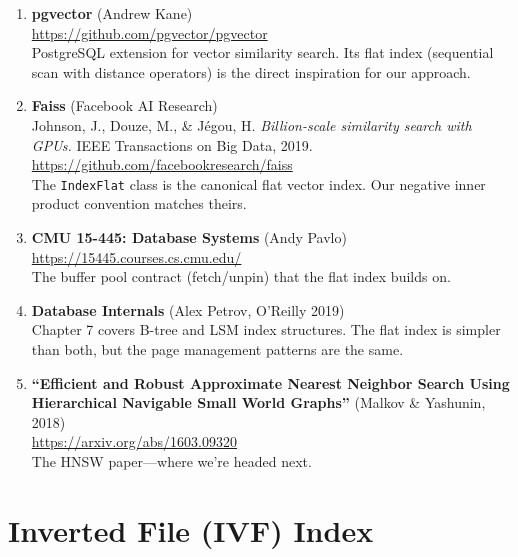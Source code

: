 \documentclass[12pt, a4paper]{report}
\begin{document}
\begin{enumerate}[itemsep=6pt]
    \item \textbf{pgvector} (Andrew Kane)\\
          \url{https://github.com/pgvector/pgvector}\\
          PostgreSQL extension for vector similarity search. Its flat
          index (sequential scan with distance operators) is the direct
          inspiration for our approach.

    \item \textbf{Faiss} (Facebook AI Research)\\
          Johnson, J., Douze, M., \& J{\'e}gou, H. \textit{Billion-scale
          similarity search with GPUs.} IEEE Transactions on Big Data, 2019.\\
          \url{https://github.com/facebookresearch/faiss}\\
          The \texttt{IndexFlat} class is the canonical flat vector index.
          Our negative inner product convention matches theirs.

    \item \textbf{CMU 15-445: Database Systems} (Andy Pavlo)\\
          \url{https://15445.courses.cs.cmu.edu/}\\
          The buffer pool contract (fetch/unpin) that the flat index
          builds on.

    \item \textbf{Database Internals} (Alex Petrov, O'Reilly 2019)\\
          Chapter 7 covers B-tree and LSM index structures. The flat
          index is simpler than both, but the page management patterns
          are the same.

    \item \textbf{``Efficient and Robust Approximate Nearest Neighbor
          Search Using Hierarchical Navigable Small World Graphs''}
          (Malkov \& Yashunin, 2018)\\
          \url{https://arxiv.org/abs/1603.09320}\\
          The HNSW paper---where we're headed next.
\end{enumerate}



\chapter{Inverted File (IVF) Index}
\end{document}
